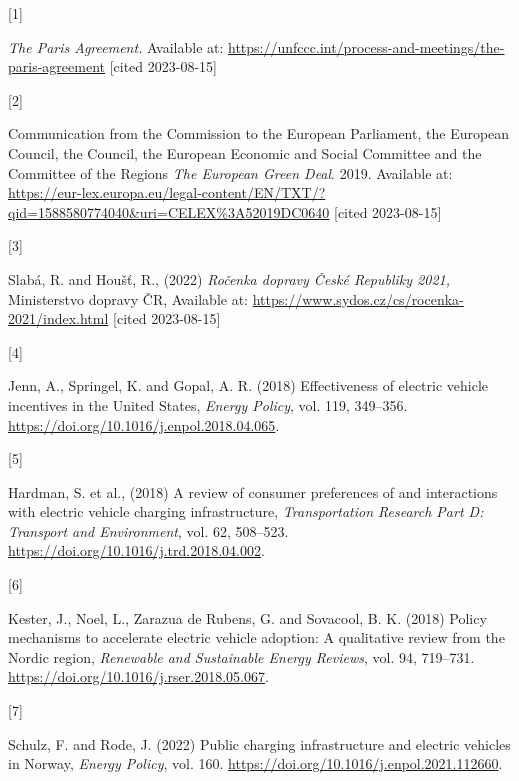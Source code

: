 \documentclass{mmeproc}
\newlength{\cslhangindent}
\newlength{\csllabelwidth}
\newenvironment{CSLReferences}[2] %
 {%
  \setlength{\parindent}{0pt}
  \ifodd #1
  \fi
  \setlength{\parskip}{-2pt}
 }%
 {}
\newcommand{\CSLLeftMargin}[1]{\parbox[t]{\csllabelwidth}{#1}}
\newcommand{\CSLRightInline}[1]{\parbox[t]{\linewidth - \csllabelwidth}{#1}\break}
\begin{document}
\hfill

\hypertarget{refs}{}
\begin{CSLReferences}{0}{0}
\leavevmode{}%
\CSLLeftMargin{{[}1{]} }%
\CSLRightInline{\emph{The {Paris} {Agreement}.} Available at:
\url{https://unfccc.int/process-and-meetings/the-paris-agreement} {{[}cited 2023-08-15{]}}}

\leavevmode{}%
\CSLLeftMargin{{[}2{]} }%
\CSLRightInline{{Communication from the {Commission} to the {European}
{Parliament}, the {European} {Council}, the {Council}, the {European}
{Economic} and {Social} {Committee} and the {Committee} of the {Regions} \emph{{The} {European} {Green} {Deal}}.} 2019. Available at:
\url{https://eur-lex.europa.eu/legal-content/EN/TXT/?qid=1588580774040\&uri=CELEX\%3A52019DC0640} {{[}cited 2023-08-15{]}}}

\leavevmode{}%
\CSLLeftMargin{{[}3{]} }%
\CSLRightInline{Slabá, R. and Houšť, R., (2022) \emph{Ročenka dopravy {České
Republiky} 2021,} {Ministerstvo dopravy ČR}, Available at:
\url{https://www.sydos.cz/cs/rocenka-2021/index.html} {{[}cited 2023-08-15{]}}}

\leavevmode{}%
\CSLLeftMargin{{[}4{]} }%
\CSLRightInline{Jenn, A., Springel, K. and Gopal, A. R. (2018) {Effectiveness
of electric vehicle incentives in the {United} {States},} \emph{Energy
Policy}, vol. 119, 349--356. \url{https://doi.org/10.1016/j.enpol.2018.04.065}.}

\leavevmode{}%
\CSLLeftMargin{{[}5{]} }%
\CSLRightInline{Hardman, S. et al., (2018) {A review of consumer
preferences of and interactions with electric vehicle charging
infrastructure,} \emph{Transportation Research Part D: Transport and
Environment}, vol. 62, 508--523. \url{https://doi.org/10.1016/j.trd.2018.04.002}.}

\leavevmode{}%
\CSLLeftMargin{{[}6{]} }%
\CSLRightInline{Kester, J., Noel,  L., Zarazua de Rubens,  G. and 
Sovacool, B. K. (2018) {Policy mechanisms to accelerate electric vehicle adoption:
{A} qualitative review from the {Nordic} region,} \emph{Renewable and
Sustainable Energy Reviews}, vol. 94, 719--731. \url{https://doi.org/10.1016/j.rser.2018.05.067}.}

\leavevmode{}%
\CSLLeftMargin{{[}7{]} }%
\CSLRightInline{Schulz, F. and Rode, J. (2022) {Public charging infrastructure
and electric vehicles in {Norway},} \emph{Energy Policy}, vol. 160. 
\url{https://doi.org/10.1016/j.enpol.2021.112660}.}


\end{CSLReferences}
\end{document}
